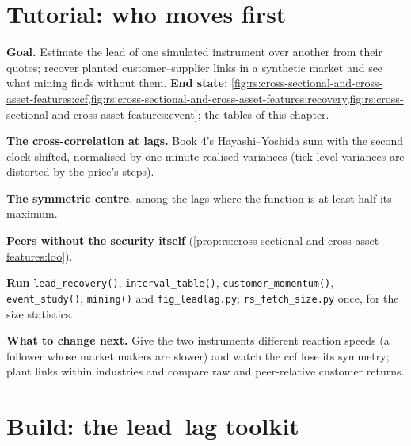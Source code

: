 \section{Tutorial: who moves first}\label{tut:rs:cross-sectional-and-cross-asset-features:tut}

\begin{tutorial}
\textbf{Goal.} Estimate the lead of one simulated instrument over another from their quotes; recover planted customer--supplier links
in a synthetic market and see what mining finds without them. \textbf{End state:}
\cref{fig:rs:cross-sectional-and-cross-asset-features:ccf,fig:rs:cross-sectional-and-cross-asset-features:recovery,fig:rs:cross-sectional-and-cross-asset-features:event};
the tables of this chapter.
\begin{tutsteps}
\item \textbf{The cross-correlation at lags.} Book 4's Hayashi--Yoshida sum with the second clock shifted, normalised by one-minute
realised variances (tick-level variances are distorted by the price's steps).
\label{lst:rs:cross-sectional-and-cross-asset-features:ccf}
\item \textbf{The symmetric centre}, among the lags where the function is at least half its maximum.
\label{lst:rs:cross-sectional-and-cross-asset-features:centre}
\item \textbf{Peers without the security itself} (\cref{prop:rs:cross-sectional-and-cross-asset-features:loo}).
\label{lst:rs:cross-sectional-and-cross-asset-features:peer}
\item \textbf{Run} \texttt{lead\_recovery()}, \texttt{interval\_table()}, \texttt{customer\_momentum()}, \texttt{event\_study()},
\texttt{mining()} and \texttt{fig\_leadlag.py}; \texttt{rs\_fetch\_size.py} once, for the size statistics.
\end{tutsteps}
\textbf{What to change next.} Give the two instruments different reaction speeds (a follower whose market makers are slower) and watch
the ccf lose its symmetry; plant links within industries and compare raw and peer-relative customer returns.
\end{tutorial}

\section{Build: the lead--lag toolkit}\label{bld:rs:cross-sectional-and-cross-asset-features:leadlag}

